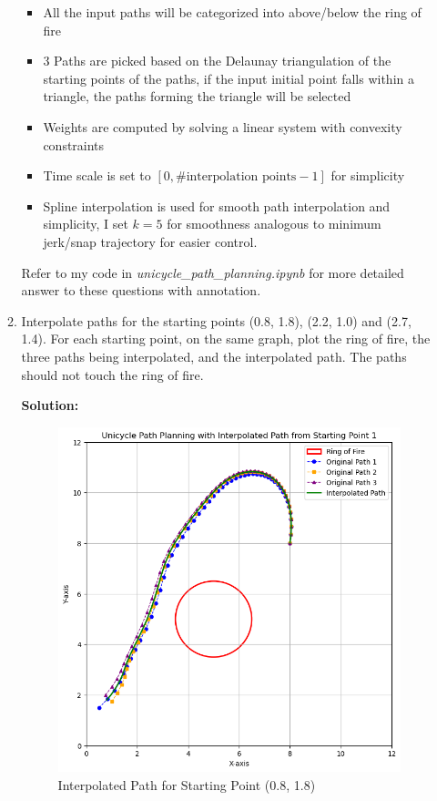 \documentclass[conference,onecolumn]{IEEEtran}
\begin{document}
\begin{enumerate}[label=\arabic{enumi}.]
\begin{enumerate}
                    \begin{itemize}
                        \item All the input paths will be categorized into above/below the ring of fire
                        \item 3 Paths are picked based on the Delaunay triangulation of the starting points of the paths, if the input initial point falls within a triangle, the paths forming the triangle will be selected
                        \item Weights are computed by solving a linear system with convexity constraints
                        \item Time scale is set to $[0, \text{\# interpolation points} - 1]$ for simplicity
                        \item Spline interpolation is used for smooth path interpolation and simplicity, I set $k = 5$ for smoothness analogous to minimum jerk/snap trajectory for easier control.
                    \end{itemize}
                    Refer to my code in \textit{unicycle\_path\_planning.ipynb} for more detailed answer to these questions with annotation.
              \item Interpolate paths for the starting points (0.8, 1.8), (2.2, 1.0) and (2.7, 1.4).
                    For each starting point, on the same graph, plot the ring of fire, the three paths being interpolated, and the interpolated path.
                    The paths should not touch the ring of fire.

                    \textbf{Solution:}

                    \begin{figure}[H]
                        \centering
                        \includegraphics[width=.99\linewidth]{"figs/Q8_path_1.png"}
                        \caption{Interpolated Path for Starting Point (0.8, 1.8)}
                    \end{figure}


\end{enumerate}
\end{enumerate}
\end{document}
